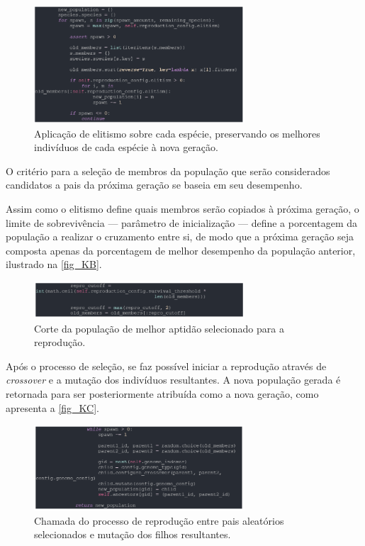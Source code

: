 \begin{figure}[htb]
        \centering
        \caption{\label{fig_KA}Aplicação de elitismo sobre cada espécie, preservando os melhores indivíduos de cada espécie à nova geração.}
        \includegraphics[width=0.7\textwidth]{images/KA.png}
\end{figure}

O critério para a seleção de membros da população que serão considerados candidatos a pais da próxima geração se baseia em seu desempenho.

Assim como o elitismo define quais membros serão copiados à próxima geração, o limite de sobrevivência
— parâmetro de inicialização — define a porcentagem da população a realizar o cruzamento entre si,
de modo que a próxima geração seja composta apenas da porcentagem de melhor desempenho da população anterior, ilustrado na \autoref{fig_KB}.

\begin{figure}[htb]
        \centering
        \caption{\label{fig_KB}Corte da população de melhor aptidão selecionado para a reprodução.}
        \includegraphics[width=0.7\textwidth]{images/KB.png}
\end{figure}

Após o processo de seleção, se faz possível iniciar a reprodução através de \textit{crossover} e a mutação dos
indivíduos resultantes. A nova população gerada é retornada para ser posteriormente atribuída como a nova geração,
como apresenta a \autoref{fig_KC}.

\begin{figure}[htb]
        \centering
        \caption{\label{fig_KC}Chamada do processo de reprodução entre pais aleatórios selecionados e mutação dos filhos resultantes.}
        \includegraphics[width=0.7\textwidth]{images/KC.png}
\end{figure}


